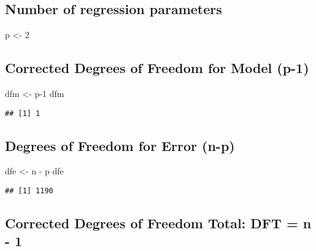 \documentclass[
]{article}
\newenvironment{Shaded}{\begin{snugshade}}{\end{snugshade}}
\newcommand{\DecValTok}[1]{\textcolor[rgb]{0.00,0.00,0.81}{#1}}
\newcommand{\NormalTok}[1]{#1}
\newcommand{\OtherTok}[1]{\textcolor[rgb]{0.56,0.35,0.01}{#1}}
\newcommand{\SpecialCharTok}[1]{\textcolor[rgb]{0.00,0.00,0.00}{#1}}
\begin{document}
\hypertarget{number-of-regression-parameters}{%
\subsection{Number of regression
parameters}\label{number-of-regression-parameters}}

\begin{Shaded}
\begin{Highlighting}[]
\NormalTok{p }\OtherTok{\textless{}{-}} \DecValTok{2}
\end{Highlighting}
\end{Shaded}

\hypertarget{corrected-degrees-of-freedom-for-model-p-1}{%
\subsection{Corrected Degrees of Freedom for Model
(p-1)}\label{corrected-degrees-of-freedom-for-model-p-1}}

\begin{Shaded}
\begin{Highlighting}[]
\NormalTok{dfm }\OtherTok{\textless{}{-}}\NormalTok{ p}\DecValTok{{-}1}
\NormalTok{dfm}
\end{Highlighting}
\end{Shaded}

\begin{verbatim}
## [1] 1
\end{verbatim}

\hypertarget{degrees-of-freedom-for-error-n-p}{%
\subsection{Degrees of Freedom for Error
(n-p)}\label{degrees-of-freedom-for-error-n-p}}

\begin{Shaded}
\begin{Highlighting}[]
\NormalTok{dfe }\OtherTok{\textless{}{-}}\NormalTok{ n }\SpecialCharTok{{-}}\NormalTok{ p}
\NormalTok{dfe}
\end{Highlighting}
\end{Shaded}

\begin{verbatim}
## [1] 1190
\end{verbatim}

\hypertarget{corrected-degrees-of-freedom-total-dft-n---1}{%
\subsection{Corrected Degrees of Freedom Total: DFT = n -
1}\label{corrected-degrees-of-freedom-total-dft-n---1}}
\end{document}
